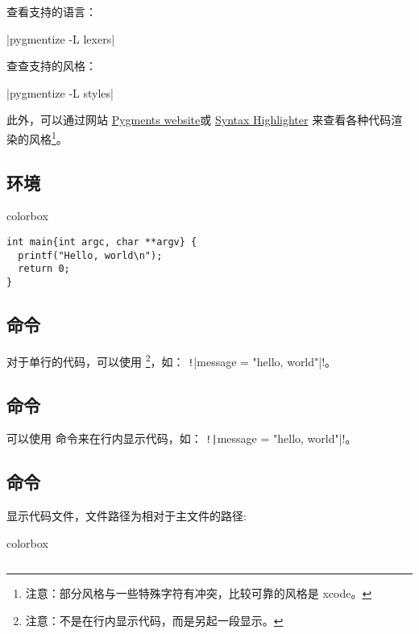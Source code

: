 
查看支持的语言：

|pygmentize -L lexers|

查查支持的风格：

|pygmentize -L styles|

此外，可以通过网站
\href{https://pygments.org/demo/}{Pygments website}或
\href{https://thepythonguru.com/tools/pygments-demo/}{Syntax Highlighter}
来查看各种代码渲染的风格\footnote{注意：部分风格与一些特殊字符有冲突，比较可靠的风格是 xcode。}。

\subsection{\protect{} 环境}

\begin{latexcode}{colorbox}
\begin{verbatim}
int main{int argc, char **argv} {
  printf("Hello, world\n");
  return 0;
}
\end{verbatim}
\end{latexcode}

\subsection{\protect{} 命令}

对于单行的代码，可以使用 
\footnote{注意：不是在行内显示代码，而是另起一段显示。}，如：
\texttt!|message = "hello, world"|!。

\subsection{\protect{} 命令}

可以使用  命令来在行内显示代码，如：
\texttt!\texttt|message = "hello, world"|!。

\subsection{\protect{} 命令}

显示代码文件，文件路径为相对于主文件的路径:

\begin{latexcode}{colorbox}
\inputminted{c}{snippets/codelistings/helloworld.c}
\end{latexcode}

